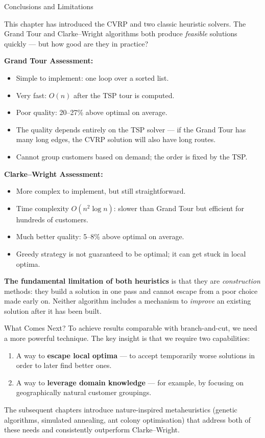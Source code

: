 \documentclass[aspectratio=169,10pt]{beamer}
\begin{document}
\begin{frame}[allowframebreaks]{Conclusions and Limitations}

  This chapter has introduced the CVRP and two classic heuristic solvers.
  The Grand Tour and Clarke--Wright algorithms both produce \emph{feasible}
  solutions quickly --- but how good are they in practice?

  \bigskip
  \textbf{Grand Tour Assessment:}
  \begin{itemize}
    \item Simple to implement: one loop over a sorted list.
    \item Very fast: $O(n)$ after the TSP tour is computed.
    \item Poor quality: 20--27\% above optimal on average.
    \item The quality depends entirely on the TSP solver --- if the Grand Tour
      has many long edges, the CVRP solution will also have long routes.
    \item Cannot group customers based on demand; the order is fixed by the TSP.
  \end{itemize}

  \bigskip
  \textbf{Clarke--Wright Assessment:}
  \begin{itemize}
    \item More complex to implement, but still straightforward.
    \item Time complexity $O(n^2 \log n)$: slower than Grand Tour but efficient
      for hundreds of customers.
    \item Much better quality: 5--8\% above optimal on average.
    \item Greedy strategy is not guaranteed to be optimal; it can get stuck
      in local optima.
  \end{itemize}

  \framebreak

  \textbf{The fundamental limitation of both heuristics} is that they are
  \emph{construction} methods: they build a solution in one pass and cannot
  escape from a poor choice made early on.  Neither algorithm includes a
  mechanism to \emph{improve} an existing solution after it has been built.

  \bigskip
  \begin{block}{What Comes Next?}
    To achieve results comparable with branch-and-cut, we need a more powerful
    technique.  The key insight is that we require two capabilities:
    \begin{enumerate}
      \item A way to \textbf{escape local optima} --- to accept temporarily
        worse solutions in order to later find better ones.
      \item A way to \textbf{leverage domain knowledge} --- for example,
        by focusing on geographically natural customer groupings.
    \end{enumerate}
    The subsequent chapters introduce nature-inspired metaheuristics (genetic
    algorithms, simulated annealing, ant colony optimisation) that address
    both of these needs and consistently outperform Clarke--Wright.
  \end{block}


\end{frame}
\end{document}
